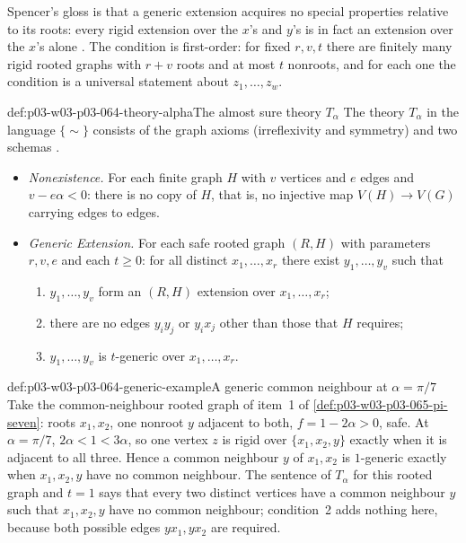 Spencer's gloss is that a generic extension acquires no special properties
relative to its roots: every rigid extension over the \(x\)'s and \(y\)'s is
in fact an extension over the \(x\)'s alone
\cite[p.~10]{Spencer2007LogicRandomStructuresAuthor}.  The condition is
first-order: for fixed \(r,v,t\) there are finitely many rigid rooted graphs
with \(r+v\) roots and at most \(t\) nonroots, and for each one the condition
is a universal statement about \(z_1,\ldots,z_w\).

\begin{hbdefinition}{def:p03-w03-p03-064-theory-alpha}{The almost sure theory \(T_\alpha\)}
The theory \(T_\alpha\) in the language \(\{\sim\}\) consists of the graph
axioms (irreflexivity and symmetry) and two schemas
\cite[p.~10]{Spencer2007LogicRandomStructuresAuthor}.
\begin{itemize}
\item \emph{Nonexistence.}  For each finite graph \(H\) with \(v\) vertices
  and \(e\) edges and \(v-e\alpha<0\): there is no copy of \(H\), that is, no
  injective map \(V(H)\to V(G)\) carrying edges to edges.
\item \emph{Generic Extension.}  For each safe rooted graph \((R,H)\) with
  parameters \(r,v,e\) and each \(t\geq0\): for all distinct
  \(x_1,\ldots,x_r\) there exist \(y_1,\ldots,y_v\) such that
  \begin{enumerate}
  \item \(y_1,\ldots,y_v\) form an \((R,H)\) extension over
    \(x_1,\ldots,x_r\);
  \item there are no edges \(y_iy_j\) or \(y_ix_j\) other than those that
    \(H\) requires;
  \item \(y_1,\ldots,y_v\) is \(t\)-generic over \(x_1,\ldots,x_r\).
  \end{enumerate}
\end{itemize}
\end{hbdefinition}

\begin{hbexample}{def:p03-w03-p03-064-generic-example}{A generic common neighbour at \(\alpha=\pi/7\)}
Take the common-neighbour rooted graph of item~1 of
\cref{def:p03-w03-p03-065-pi-seven}: roots \(x_1,x_2\), one nonroot \(y\)
adjacent to both, \(f=1-2\alpha>0\), safe.  At \(\alpha=\pi/7\),
\(2\alpha<1<3\alpha\), so one vertex \(z\) is rigid over
\(\{x_1,x_2,y\}\) exactly when it is adjacent to all three.  Hence a common
neighbour \(y\) of \(x_1,x_2\) is \(1\)-generic exactly when \(x_1,x_2,y\)
have no common neighbour.  The sentence of \(T_\alpha\) for this rooted graph
and \(t=1\) says that every two distinct vertices have a common neighbour
\(y\) such that \(x_1,x_2,y\) have no common neighbour; condition~2 adds
nothing here, because both possible edges \(yx_1,yx_2\) are required.
\end{hbexample}

